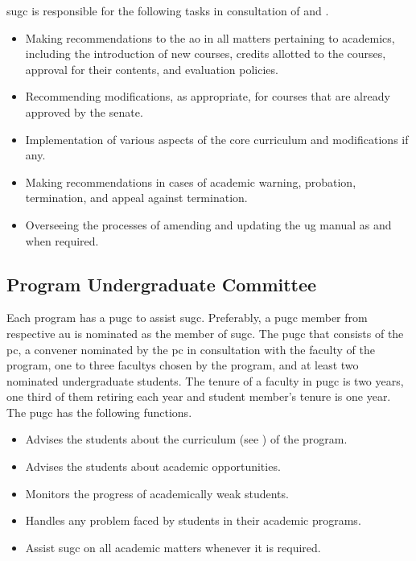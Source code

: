 \acrshort{sugc} is responsible for the following tasks in consultation of  and .

\begin{itemize}[leftmargin=15mm]
	\item Making recommendations to the \acrshort{ao} in  all matters pertaining to academics, including the introduction of new courses, credits allotted to the courses, approval for their contents, and evaluation policies.
	\item Recommending modifications, as appropriate, for courses that are already approved by the \gls{senate}.
	\item Implementation of various aspects of the core curriculum and modifications if any.
	\item Making recommendations in cases of academic warning, probation, termination, and appeal against termination.
	\item Overseeing the processes of amending and updating the \acrshort{ug} manual as and when required. 
\end{itemize}

\subsection{Program Undergraduate Committee \label{lab:PUGC}}

Each \gls{program} has a \acrfull{pugc} to assist \acrshort{sugc}. Preferably, a \acrshort{pugc} member from respective \acrshort{au} is nominated as the member of \acrshort{sugc}. The \acrfull{pugc} that consists of the \Gls{pc}, a convener nominated by the \acrshort{pc} in consultation with the \gls{faculty} of the \gls{program}, one to three \glspl{faculty} chosen by the \gls{program}, and at least two nominated undergraduate \glspl{student}. The tenure of a \gls{faculty} in \acrshort{pugc} is two years, one third of them retiring each year and student member’s tenure is one year. The \acrshort{pugc} has the following functions.

\begin{itemize}[leftmargin=15mm]
	\item Advises the \glspl{student} about the curriculum (see ) of the \gls{program}. 
	\item Advises the \glspl{student} about academic opportunities. 
	\item Monitors the progress of academically weak \glspl{student}. 
	\item Handles any problem faced by \glspl{student} in their academic programs.
	\item Assist \acrshort{sugc} on all academic matters whenever it is required.
\end{itemize}

